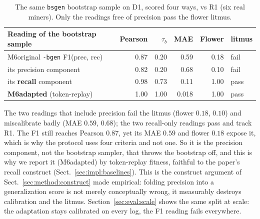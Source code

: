 \documentclass[runningheads]{llncs}
\newcommand{\chg}[1]{\textcolor{chgblue}{#1}}
\begin{document}
\begin{table}[t]
\centering
\caption{The same \texttt{bsgen} bootstrap sample on D1, scored four ways, vs R1 (six real miners). Only the readings free of precision pass the flower litmus.}
\label{tab:m6}
\setlength{\tabcolsep}{5pt}
\footnotesize
\begin{tabular}{@{}lrrrrl@{}}
\toprule
Reading of the bootstrap sample & Pearson & $\tau_b$ & MAE & Flower & litmus \\
\midrule
M6original \texttt{-bgen} F1(prec, rec) & 0.87 & 0.20 & 0.59 & 0.18 & fail \\
\quad its precision component & 0.82 & 0.20 & 0.68 & 0.10 & fail \\
\quad its \textbf{recall} component & 0.98 & 0.73 & 0.11 & 1.00 & pass \\
\textbf{M6adapted} (token-replay) & 1.00 & 1.00 & 0.018 & 1.00 & pass \\
\bottomrule
\end{tabular}
\end{table}

The two readings that include precision fail the litmus (flower $0.18$, $0.10$) and miscalibrate badly (MAE $0.59$, $0.68$); the two recall-only readings pass and track R1. The F1 still reaches Pearson $0.87$, yet its MAE $0.59$ and flower $0.18$ expose it, which is why the protocol uses four criteria and not one. So it is the precision component, not the bootstrap sampler, that throws the bootstrap off, and this is why we report it (M6adapted) by token-replay fitness, faithful to the paper's recall construct (Sect.~\ref{sec:impl:baselines}). \chg{This is the construct argument of Sect.~\ref{sec:method:construct} made empirical: folding precision into a generalization score is not merely conceptually wrong, it measurably destroys calibration and the litmus. Section~\ref{sec:eval:scale} shows the same split at scale: the adaptation stays calibrated on every log, the F1 reading fails everywhere.}
\end{document}
